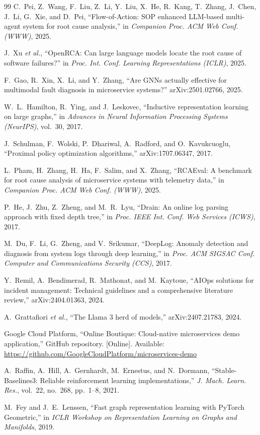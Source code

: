 \documentclass[conference,a4paper]{IEEEtran}
\begin{document}
\begin{thebibliography}{99}
C.~Pei, Z.~Wang, F.~Liu, Z.~Li, Y.~Liu, X.~He, R.~Kang, T.~Zhang, J.~Chen, J.~Li, G.~Xie, and D.~Pei, ``Flow-of-Action: SOP enhanced LLM-based multi-agent system for root cause analysis,'' in \emph{Companion Proc. ACM Web Conf. (WWW)}, 2025.

J.~Xu \emph{et al.}, ``OpenRCA: Can large language models locate the root cause of software failures?'' in \emph{Proc. Int. Conf. Learning Representations (ICLR)}, 2025.

F.~Gao, R.~Xin, X.~Li, and Y.~Zhang, ``Are GNNs actually effective for multimodal fault diagnosis in microservice systems?'' arXiv:2501.02766, 2025.

W.~L.~Hamilton, R.~Ying, and J.~Leskovec, ``Inductive representation learning on large graphs,'' in \emph{Advances in Neural Information Processing Systems (NeurIPS)}, vol.~30, 2017.

J.~Schulman, F.~Wolski, P.~Dhariwal, A.~Radford, and O.~Kavukcuoglu, ``Proximal policy optimization algorithms,'' arXiv:1707.06347, 2017.

L.~Pham, H.~Zhang, H.~Ha, F.~Salim, and X.~Zhang, ``RCAEval: A benchmark for root cause analysis of microservice systems with telemetry data,'' in \emph{Companion Proc. ACM Web Conf. (WWW)}, 2025.

P.~He, J.~Zhu, Z.~Zheng, and M.~R.~Lyu, ``Drain: An online log parsing approach with fixed depth tree,'' in \emph{Proc. IEEE Int. Conf. Web Services (ICWS)}, 2017.

M.~Du, F.~Li, G.~Zheng, and V.~Srikumar, ``DeepLog: Anomaly detection and diagnosis from system logs through deep learning,'' in \emph{Proc. ACM SIGSAC Conf. Computer and Communications Security (CCS)}, 2017.

Y.~Remil, A.~Bendimerad, R.~Mathonat, and M.~Kaytoue, ``AIOps solutions for incident management: Technical guidelines and a comprehensive literature review,'' arXiv:2404.01363, 2024.

A.~Grattafiori \emph{et al.}, ``The Llama 3 herd of models,'' arXiv:2407.21783, 2024.

Google Cloud Platform, ``Online Boutique: Cloud-native microservices demo application,'' GitHub repository. [Online]. Available: \url{https://github.com/GoogleCloudPlatform/microservices-demo}

A.~Raffin, A.~Hill, A.~Gernhardt, M.~Ernestus, and N.~Dormann, ``Stable-Baselines3: Reliable reinforcement learning implementations,'' \emph{J. Mach. Learn. Res.}, vol.~22, no.~268, pp.~1--8, 2021.

M.~Fey and J.~E.~Lenssen, ``Fast graph representation learning with PyTorch Geometric,'' in \emph{ICLR Workshop on Representation Learning on Graphs and Manifolds}, 2019.

\end{thebibliography}
\end{document}

